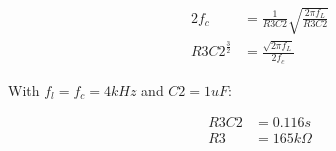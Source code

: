 \begin{equation}
    \begin{split}
        2f_{c} &= \frac{1}{R3C2}\sqrt{\frac{2\pi f_{L}}{R3C2}}\\
        R3C2^{\frac{3}{2}} &= \frac{\sqrt{2\pi f_{L}}}{2f_{c}}
    \end{split}
    \label{eqn:pllBandwidth}
\end{equation}

With $f_{l} = f_{c} = 4 kHz$ and $C2 = 1 uF$:

\begin{equation*}
    \begin{split}
        R3C2 &= 0.116s\\
        R3 &= 165 k\Omega
    \end{split}
\end{equation*}
